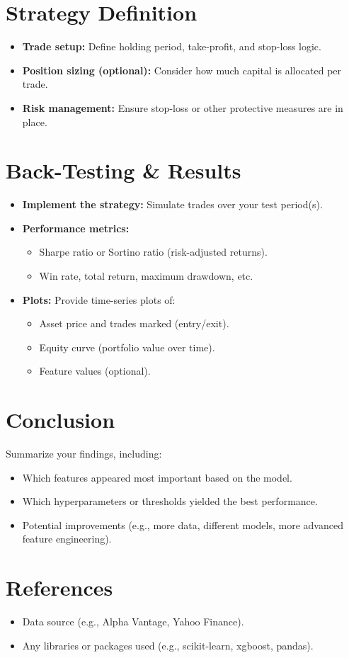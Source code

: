 \documentclass[11pt]{article}
\begin{document}
\section{Strategy Definition}
\begin{itemize}
    \item \textbf{Trade setup:} Define holding period, take-profit, and stop-loss logic.
    \item \textbf{Position sizing (optional):} Consider how much capital is allocated per trade.
    \item \textbf{Risk management:} Ensure stop-loss or other protective measures are in place.
\end{itemize}

\section{Back-Testing \& Results}
\begin{itemize}
    \item \textbf{Implement the strategy:} Simulate trades over your test period(s).
    \item \textbf{Performance metrics:} 
    \begin{itemize}
        \item Sharpe ratio or Sortino ratio (risk-adjusted returns).
        \item Win rate, total return, maximum drawdown, etc.
    \end{itemize}
    \item \textbf{Plots:} Provide time-series plots of:
    \begin{itemize}
        \item Asset price and trades marked (entry/exit).
        \item Equity curve (portfolio value over time).
        \item Feature values (optional).
    \end{itemize}
\end{itemize}

\section{Conclusion}
Summarize your findings, including:
\begin{itemize}
    \item Which features appeared most important based on the model.
    \item Which hyperparameters or thresholds yielded the best performance.
    \item Potential improvements (e.g., more data, different models, more advanced feature engineering).
\end{itemize}

\section{References}
\begin{itemize}
    \item Data source (e.g., Alpha Vantage, Yahoo Finance).
    \item Any libraries or packages used (e.g., scikit-learn, xgboost, pandas).
\end{itemize}
\end{document}

